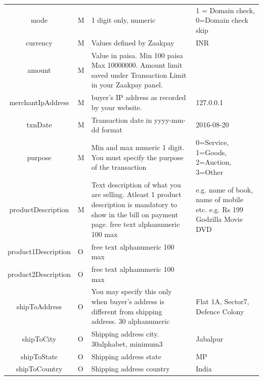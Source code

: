 \documentclass{article}
\begin{document}
\begin{longtable}{||c| p{2.09cm}|| p{5.5cm}| p{4.7cm}||}
mode & M & 1 digit only, numeric & 1 = Domain check, 0=Domain check skip\\
currency & M & Values defined by Zaakpay & INR\\
amount & M & Value in paisa. Min 100 paisa Max 10000000. Amount limit saved under Transaction Limit in your Zaakpay panel. & \\
merchantIpAddress & M & buyer's IP address as recorded by your website. & 127.0.0.1 \\
txnDate & M & Transaction date in yyyy-mm-dd format & 2016-08-20 \\
purpose & M & Min and max numeric 1 digit. You must specify the purpose of the transaction & 0=Service, 1=Goods, 2=Auction, 3=Other\\
productDescription & M & Text description of what you are selling. Atleast 1 product description is mandatory to show in the bill on payment page. free text alphanumeric 100 max & e.g. name of book, name of mobile etc. e.g. Rs 199 Godzilla Movie DVD \\
product1Description & O & free text alphanumeric 100 max & \\
product2Description & O & free text alphanumeric 100 max & \\
shipToAddress & O & You may specify this only when buyer's address is different from shipping address. 30 alphanumeric & Flat 1A, Sector7, Defence Colony \\
shipToCity & O & Shipping address city. 30alphabet, minimum3 & Jabalpur \\
shipToState & O & Shipping address state & MP \\
shipToCountry & O & Shipping address country & India \\


\end{longtable}
\end{document}
